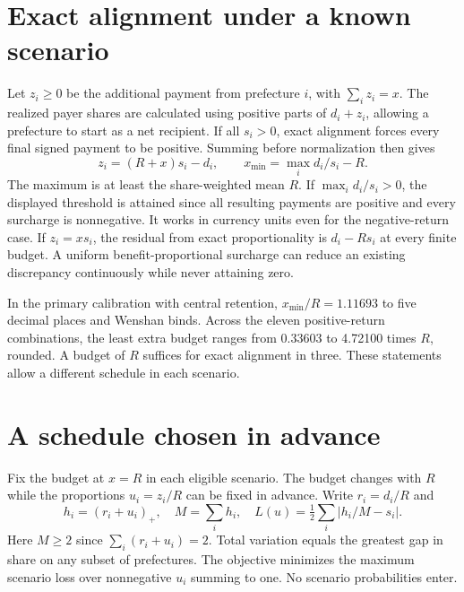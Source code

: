 \documentclass[11pt]{article}
\begin{document}
\section{Exact alignment under a known scenario}
Let $z_i\ge0$ be the additional payment from prefecture $i$, with $\sum_i z_i=x$. The realized payer shares are calculated using positive parts of $d_i+z_i$, allowing a prefecture to start as a net recipient. If all $s_i>0$, exact alignment forces every final signed payment to be positive. Summing before normalization then gives
\[
 z_i=(R+x)s_i-d_i,\qquad x_{\min}=\max_i d_i/s_i-R .
\]
The maximum is at least the share-weighted mean $R$. If $\max_i d_i/s_i>0$, the displayed threshold is attained since all resulting payments are positive and every surcharge is nonnegative. It works in currency units even for the negative-return case. If $z_i=xs_i$, the residual from exact proportionality is $d_i-Rs_i$ at every finite budget. A uniform benefit-proportional surcharge can reduce an existing discrepancy continuously while never attaining zero.

In the primary calibration with central retention, $x_{\min}/R=1.11693$ to five decimal places and Wenshan binds. Across the eleven positive-return combinations, the least extra budget ranges from 0.33603 to 4.72100 times $R$, rounded. A budget of $R$ suffices for exact alignment in three. These statements allow a different schedule in each scenario.

\section{A schedule chosen in advance}
Fix the budget at $x=R$ in each eligible scenario. The budget changes with $R$ while the proportions $u_i=z_i/R$ can be fixed in advance. Write $r_i=d_i/R$ and
\[
 h_i=(r_i+u_i)_+,\quad M=\sum_i h_i,\quad
 L(u)=\tfrac12\sum_i |h_i/M-s_i| .
\]
Here $M\ge2$ since $\sum_i(r_i+u_i)=2$. Total variation equals the greatest gap in share on any subset of prefectures. The objective minimizes the maximum scenario loss over nonnegative $u_i$ summing to one. No scenario probabilities enter.
\end{document}
